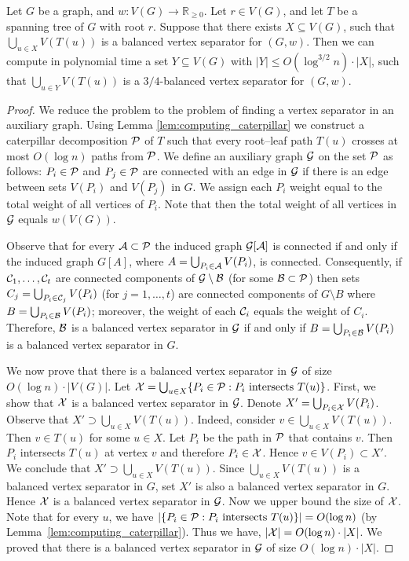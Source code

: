 \documentclass[envcountsect]{llncs}
\begin{document}
\begin{lemma}\label{lem:genus_separator_weighted_approximate}
Let $G$ be a graph, and $w:V(G)\to \mathbb{R}_{\geq 0}$.
Let $r\in V(G)$, and let $T$ be a spanning tree of $G$ with root $r$.
Suppose that there exists $X\subseteq V(G)$, such that $\bigcup_{u\in X} V(T(u))$ is a balanced vertex separator for $(G,w)$.
Then we can compute in polynomial time a set $Y\subseteq V(G)$ 
with $|Y| \leq O(\log^{3/2} n) \cdot |X|$, such that $\bigcup_{u\in Y} V(T(u))$ is a $3/4$-balanced vertex separator for $(G,w)$.
\end{lemma}
\begin{proof}
We reduce the problem to the problem of finding a vertex separator in an auxiliary graph.
Using Lemma \ref{lem:computing_caterpillar} we construct a caterpillar decomposition ${\cal P}$ of $T$ such that every root--leaf path $T(u)$ crosses
at most $O(\log n)$ paths from $\cal P$. We define an auxiliary graph ${\cal G}$ on the set $\cal P$ as follows:
$P_i\in \cal P$ and $P_j \in \cal P$ are connected with an edge in ${\cal G}$ if there is an edge between sets
$V(P_i)$ and $V(P_j)$ in $G$. We assign each $P_i$ weight equal to the total weight of all 
vertices of $P_i$. Note that then the total weight of all vertices in $\cal G$ equals $w(V(G))$.

Observe that for every ${\cal A}\subset {\cal P}$ the induced graph ${\cal G}[{\cal A}]$ is connected if and only if 
the induced graph $G[A]$, where  $A=\bigcup_{P_i\in {\cal A}} V(P_i)$, is connected. Consequently,
if ${\cal C}_1, \dots,{\cal C}_t$ are connected components of ${\cal G} \setminus {\cal B}$
(for some ${\cal B}\subset {\cal P}$) then sets $C_j = \bigcup_{P_i\in {\cal C}_j} V(P_i)$ (for $j=1,\dots,t$) are connected 
components of $G \setminus B$ where $B=\bigcup_{P_i\in {\cal B}} V(P_i)$; moreover, the weight of each ${\cal C}_i$ equals
the weight of $C_i$.
Therefore, $\cal B$ is a balanced vertex separator in $\cal G$ if and only if 
$B=\bigcup_{P_i\in {\cal B}} V(P_i)$ is a balanced vertex separator in $G$.

We now prove that there is a balanced vertex separator in $\cal G$ of size
$O(\log n) \cdot |V(G)|$. Let ${\cal X} = \bigcup_{u\in X} \{P_i\in {\cal P}: P_i \text{ intersects } T(u)\}$.
First, we show that ${\cal X}$ is a balanced vertex separator in $\cal G$.
Denote $X' = \bigcup_{P_i\in {\cal X}} V(P_i)$. Observe that $X' \supset \bigcup_{u\in X} V(T(u))$. Indeed,
consider $v\in \bigcup_{u\in X} V(T(u))$. Then $v\in T(u)$ for some $u\in X$. Let $P_i$ be the path in $\cal P$ that contains $v$. 
Then $P_i$ intersects $T(u)$ at vertex $v$ and therefore $P_ i\in {\cal X}$. Hence $v \in V(P_i) \subset X'$.
We conclude that $X' \supset \bigcup_{u\in X} V(T(u))$. Since $\bigcup_{u\in X} V(T(u))$ is a balanced vertex separator in $G$,
set $X'$ is also a balanced vertex separator in $G$. Hence $\cal X$ is a balanced vertex separator in $\cal G$.
Now we upper bound the size of $\cal X$. Note that for every $u$, we have
$|\{P_i\in {\cal P}: P_i \text{ intersects } T(u)\}| = O(\log n)$ (by Lemma~\ref{lem:computing_caterpillar}). Thus we have,
$|{\cal X}| = O(\log n) \cdot |X|$. We proved that there is a balanced vertex separator in $\cal G$ of size
$O(\log n) \cdot |X|$. 


\end{proof}
\end{document}
